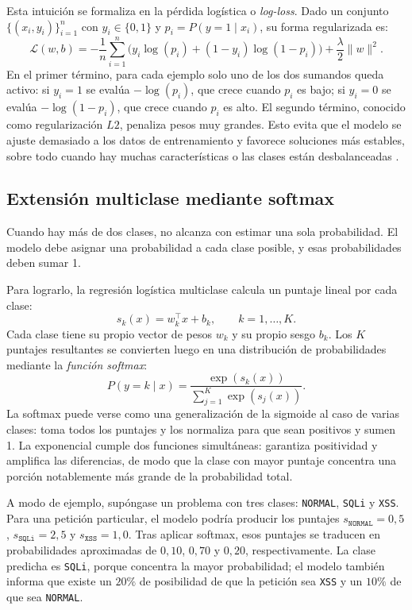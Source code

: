 \documentclass[12pt,oneside]{report}
\begin{document}
Esta intuición se formaliza en la pérdida logística o \textit{log-loss}.
Dado un conjunto $\{(x_i,y_i)\}_{i=1}^n$ con $y_i\in\{0,1\}$ y
$p_i=P(y=1\mid x_i)$, su forma regularizada es:
\[
\mathcal{L}(w,b)=
-\frac{1}{n}\sum_{i=1}^n
\Big(y_i\log(p_i) + (1-y_i)\log(1-p_i)\Big)
+ \frac{\lambda}{2}\lVert w\rVert^2.
\]
En el primer término, para cada ejemplo solo uno de los dos sumandos queda
activo: si $y_i=1$ se evalúa $-\log(p_i)$, que crece cuando $p_i$ es bajo;
si $y_i=0$ se evalúa $-\log(1-p_i)$, que crece cuando $p_i$ es alto. El
segundo término, conocido como regularización $L2$, penaliza pesos muy
grandes. Esto evita que el modelo se ajuste demasiado a los datos de
entrenamiento y favorece soluciones más estables, sobre todo cuando hay
muchas características o las clases están desbalanceadas
\cite{islr_logreg,sklearn_logreg}.

\subsection{Extensión multiclase mediante softmax}

Cuando hay más de dos clases, no alcanza con estimar una sola probabilidad.
El modelo debe asignar una probabilidad a cada clase posible, y esas
probabilidades deben sumar 1.

Para lograrlo, la regresión logística multiclase calcula un puntaje lineal
por cada clase:
\[
s_k(x)=w_k^\top x + b_k, \qquad k=1,\dots,K.
\]
Cada clase tiene su propio vector de pesos $w_k$ y su propio sesgo $b_k$.
Los $K$ puntajes resultantes se convierten luego en una distribución de
probabilidades mediante la \textit{función softmax}:
\[
P(y=k\mid x)=\frac{\exp(s_k(x))}{\sum_{j=1}^K \exp(s_j(x))}.
\]
La softmax puede verse como una generalización de la sigmoide al caso de
varias clases: toma todos los puntajes y los normaliza para que sean
positivos y sumen 1. La exponencial cumple dos funciones simultáneas:
garantiza positividad y amplifica las diferencias, de modo que la clase con
mayor puntaje concentra una porción notablemente más grande de la
probabilidad total.

A modo de ejemplo, supóngase un problema con tres clases: \texttt{NORMAL},
\texttt{SQLi} y \texttt{XSS}. Para una petición particular, el modelo podría
producir los puntajes $s_{\texttt{NORMAL}}=0{,}5$, $s_{\texttt{SQLi}}=2{,}5$
y $s_{\texttt{XSS}}=1{,}0$. Tras aplicar softmax, esos puntajes se traducen
en probabilidades aproximadas de $0{,}10$, $0{,}70$ y $0{,}20$,
respectivamente. La clase predicha es \texttt{SQLi}, porque concentra la
mayor probabilidad; el modelo también informa que existe un $20\%$ de
posibilidad de que la petición sea \texttt{XSS} y un $10\%$ de que sea
\texttt{NORMAL}.
\end{document}

